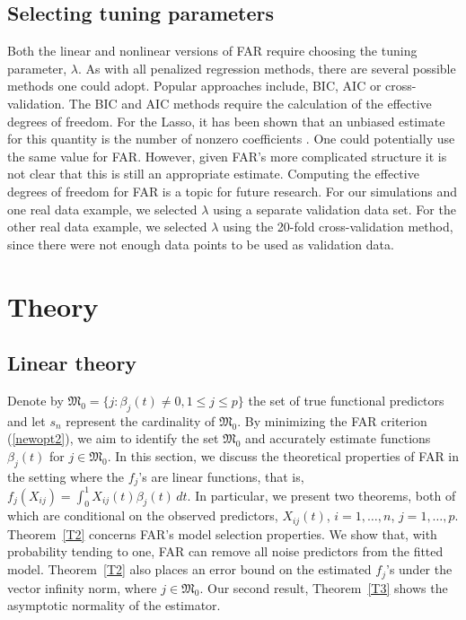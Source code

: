 \documentclass[aos,MSNbibl,dvips]{arximspdf}
\newcommand{\Mfrak}{\mathfrak{M}}
\begin{document}
\subsection{Selecting tuning parameters}

Both the linear and nonlinear versions of FAR require choosing the tuning
parameter, $\lambda$. As with all penalized regression methods, there are
several possible methods one could adopt. Popular approaches include,
BIC, AIC or cross-validation. The BIC and AIC methods require the
calculation of the effective degrees of freedom. For the Lasso, it has been
shown that an unbiased estimate for this quantity is the number of
nonzero coefficients \cite{zou2}. One could potentially use the
same value for
FAR. However, given FAR's more complicated structure it is not clear that
this is still an appropriate estimate. Computing the effective degrees of
freedom for FAR is a topic for future research. For our simulations and
one real data example, we
selected $\lambda$
using a separate validation data set. For the other real data example,
we selected $\lambda$ using the 20-fold cross-validation method, since
there were not enough data points to be used as validation data.



\section{Theory}
\label{theorysec}

\subsection{Linear theory}

Denote by $\Mfrak_0 = \{j: \beta_j(t)\neq0, 1\leq j\leq p\}$ the set
of true functional predictors and let $s_n$ represent the cardinality
of $\Mfrak_0$.
By minimizing the FAR criterion (\ref{newopt2}), we aim to identify
the set $\Mfrak_0$ and accurately estimate functions $\beta_j(t)$ for
$j\in\Mfrak_0$. In this section,
we discuss the theoretical properties of FAR in the setting where the
$f_j$'s are linear functions, that is, $f_j(X_{ij}) = \int
_0^1X_{ij}(t)\beta_j(t)\,dt$. In particular,
we present two theorems, both of which are conditional on the observed
predictors, $X_{ij}(t)$, $i=1,\ldots, n$, $j = 1, \ldots, p$.
Theorem~\ref{T2} concerns FAR's model selection properties. We show
that, with probability tending to one, FAR can remove all noise predictors
from the fitted model. Theorem~\ref{T2} also places an error bound on
the estimated $f_j$'s under the vector infinity norm, where $j\in
\Mfrak_0$. Our second result, Theorem~\ref{T3}
shows the asymptotic normality of the estimator.
\end{document}
